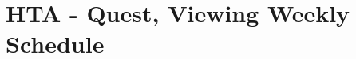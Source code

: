 \documentclass[10pt]{article}
\begin{document}
\section*{HTA - Quest, Viewing Weekly Schedule}
\begin{center}
\end{center}
\end{document}
